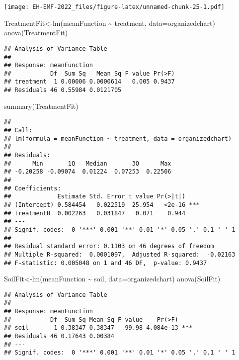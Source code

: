 \documentclass[
]{article}
\newenvironment{Shaded}{\begin{snugshade}}{\end{snugshade}}
\newcommand{\AttributeTok}[1]{\textcolor[rgb]{0.77,0.63,0.00}{#1}}
\newcommand{\FunctionTok}[1]{\textcolor[rgb]{0.00,0.00,0.00}{#1}}
\newcommand{\NormalTok}[1]{#1}
\newcommand{\OtherTok}[1]{\textcolor[rgb]{0.56,0.35,0.01}{#1}}
\newcommand{\SpecialCharTok}[1]{\textcolor[rgb]{0.00,0.00,0.00}{#1}}
\begin{document}
\texttt{[image: EH-EMF-2022\_files/figure-latex/unnamed-chunk-25-1.pdf]}

\begin{Shaded}
\begin{Highlighting}[]
\NormalTok{TreatmentFit}\OtherTok{\textless{}{-}}\FunctionTok{lm}\NormalTok{(meanFunction }\SpecialCharTok{\textasciitilde{}}\NormalTok{ treatment, }\AttributeTok{data=}\NormalTok{organizedchart)}
\FunctionTok{anova}\NormalTok{(TreatmentFit)}
\end{Highlighting}
\end{Shaded}

\begin{verbatim}
## Analysis of Variance Table
## 
## Response: meanFunction
##           Df  Sum Sq   Mean Sq F value Pr(>F)
## treatment  1 0.00006 0.0000614   0.005 0.9437
## Residuals 46 0.55984 0.0121705
\end{verbatim}

\begin{Shaded}
\begin{Highlighting}[]
\FunctionTok{summary}\NormalTok{(TreatmentFit)}
\end{Highlighting}
\end{Shaded}

\begin{verbatim}
## 
## Call:
## lm(formula = meanFunction ~ treatment, data = organizedchart)
## 
## Residuals:
##      Min       1Q   Median       3Q      Max 
## -0.20258 -0.09074  0.01224  0.07253  0.22506 
## 
## Coefficients:
##             Estimate Std. Error t value Pr(>|t|)    
## (Intercept) 0.584454   0.022519  25.954   <2e-16 ***
## treatmentH  0.002263   0.031847   0.071    0.944    
## ---
## Signif. codes:  0 '***' 0.001 '**' 0.01 '*' 0.05 '.' 0.1 ' ' 1
## 
## Residual standard error: 0.1103 on 46 degrees of freedom
## Multiple R-squared:  0.0001097,  Adjusted R-squared:  -0.02163 
## F-statistic: 0.005048 on 1 and 46 DF,  p-value: 0.9437
\end{verbatim}

\begin{Shaded}
\begin{Highlighting}[]
\NormalTok{SoilFit}\OtherTok{\textless{}{-}}\FunctionTok{lm}\NormalTok{(meanFunction }\SpecialCharTok{\textasciitilde{}}\NormalTok{ soil, }\AttributeTok{data=}\NormalTok{organizedchart)}
\FunctionTok{anova}\NormalTok{(SoilFit)}
\end{Highlighting}
\end{Shaded}

\begin{verbatim}
## Analysis of Variance Table
## 
## Response: meanFunction
##           Df  Sum Sq Mean Sq F value    Pr(>F)    
## soil       1 0.38347 0.38347   99.98 4.084e-13 ***
## Residuals 46 0.17643 0.00384                      
## ---
## Signif. codes:  0 '***' 0.001 '**' 0.01 '*' 0.05 '.' 0.1 ' ' 1
\end{verbatim}
\end{document}
